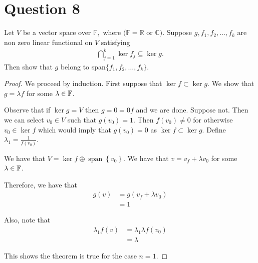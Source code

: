 \section{Question 8}
\horz

Let $V$ be a vector space over $\mathbb F,$  where $(\mathbb F = \mathbb R$ or  $\mathbb C).$ Suppose $g,f_1,f_2,\ldots,f_k$ are non zero linear functional on $V$ satisfying 
\begin{align*}
\bigcap _{j=1}^k \ker f_j \subseteq \ker g.
\end{align*}
Then show that $g$ belong to span$\{f_1,f_2,\ldots,f_k\}.$

\horz

\begin{proof}
    We proceed by induction. First suppose that $\ker f \subset \ker g$. We show that $g = \lambda f$ for some $\lambda \in \mathbb F$. 

    Observe that if $\ker g= V$ then $g=0 =0f$ and we are done. Suppose not. Then we can select $v_{0} \in V$ such that $g\left( v_{0} \right) = 1$. Then $f\left( v_{0} \right) \ne 0$ for otherwise $v_{0} \in \ker f$ which would imply that $g\left( v_{0} \right) = 0$ as $\ker f \subset \ker g$. Define $\lambda_{1} =  \frac{1}{f\left( v_{0} \right)}$.

    We have that $V=\ker f \oplus \operatorname{span} \left\{ v_{0} \right\}$. We have that $v= v_{f} + \lambda v_{0}$ for some $\lambda \in \mathbb F$.

    Therefore, we have that
    \begin{align*}
	g\left( v \right) &= g\left( v_{f} + \lambda v_{0} \right) \\
	&= 1
    \end{align*}

    Also, note that
    \begin{align*}
	\lambda_{1} f\left( v \right) &= \lambda _{1} \lambda f\left( v_{0} \right)\\
	&= \lambda
    \end{align*}

    This shows the theorem is true for the case $n=1$.
\end{proof}
